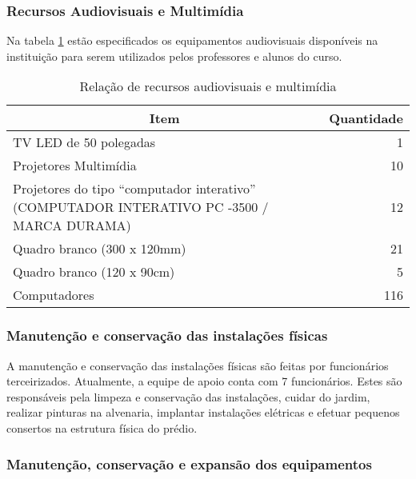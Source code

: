 \subsubsection{Recursos Audiovisuais e Multimídia}

Na tabela \ref{table:audiovisual} estão especificados os equipamentos audiovisuais disponíveis na instituição para serem utilizados pelos professores e alunos do curso.

\begin{table}[h]
\small
\caption{Relação de recursos audiovisuais e multimídia}
\begin{center}
\begin{tabular}{|p{12cm}|r|}
\hline
\multicolumn{1}{|c|}{\textbf{Item}} & \multicolumn{1}{c|}{\textbf{Quantidade}} \\ \hline
TV  LED de 50 polegadas             & 1                                        \\ \hline
Projetores Multimídia               & 10                                        \\ \hline
Projetores do tipo ``computador interativo'' (COMPUTADOR INTERATIVO PC -3500 / MARCA DURAMA) & 12 \\ \hline
Quadro branco (300 x 120mm)         & 21                                       \\ \hline
Quadro branco (120 x 90cm)          & 5											\\ \hline 
Computadores                        & 116                                       \\ \hline
\end{tabular}
\end{center}
\label{table:audiovisual}
\end{table}

\subsubsection{Manutenção e conservação das instalações físicas}

A manutenção e conservação das instalações físicas são feitas por funcionários terceirizados. Atualmente, a equipe de apoio conta com 7 funcionários. Estes são responsáveis pela limpeza e conservação das instalações, cuidar do jardim, realizar pinturas na alvenaria, implantar instalações elétricas e efetuar pequenos consertos na estrutura física do prédio.

\subsubsection{Manutenção, conservação e expansão dos equipamentos}

